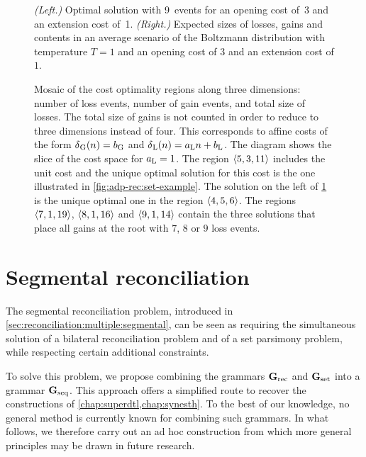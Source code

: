 \begin{figure}[p]
    \capstart
    \centering
    
    \caption[Alternative solution and expected group sizes]{
        \emph{(Left.)}
        Optimal solution with 9~events for an opening cost of~3 and an extension cost of~1.
        \emph{(Right.)}
        Expected sizes of losses, gains and contents in an average scenario of the Boltzmann distribution with temperature \(T=1\) and an opening cost of \(3\) and an extension cost of \(1\).
    }
    \label{fig:adp-rec:set-solutions}
\end{figure}

\begin{figure}[p]
    \capstart
    \centering
    
    \caption[Mosaic of cost regions for a group parsimony instance]{
        Mosaic of the cost optimality regions along three dimensions: number of loss events, number of gain events, and total size of losses.
        The total size of gains is not counted in order to reduce to three dimensions instead of four.
        This corresponds to affine costs of the form \(\delta\kern.1pt_{\mathrm{G}}(n) = b_{\mathrm{G}}\) and \(\delta\kern.1pt_{\mathrm{L}}(n) = a_{\mathrm{L}} n + b_{\mathrm{L}}\).
        The diagram shows the slice of the cost space for \(a_{\mathrm{L}} = 1\).
        The region \(\left\langle5, 3, 11\right\rangle\) includes the unit cost and the unique optimal solution for this cost is the one illustrated in \cref{fig:adp-rec:set-example}.
        The solution on the left of \cref{fig:adp-rec:set-solutions} is the unique optimal one in the region \(\left\langle4, 5, 6\right\rangle\).
        The regions \(\left\langle7, 1, 19\right\rangle\), \(\left\langle8, 1, 16\right\rangle\) and \(\left\langle9, 1, 14\right\rangle\) contain the three solutions that place all gains at the root with \(7\), \(8\) or \(9\) loss events.
    }
    \label{fig:adp-rec:set-pareto}
\end{figure}

\section{Segmental reconciliation}\label{sec:adp-rec:both}

The segmental reconciliation problem, introduced in \cref{sec:reconciliation:multiple:segmental}, can be seen as requiring the simultaneous solution of a bilateral reconciliation problem and of a set parsimony problem, while respecting certain additional constraints.

To solve this problem, we propose combining the grammars \(\mathbf{G}_{\mathrm{rec}}\) and \(\mathbf{G}_{\mathrm{set}}\) into a grammar \(\mathbf{G}_{\mathrm{seq}}\).
This approach offers a simplified route to recover the constructions of \cref{chap:superdtl,chap:synesth}.
To the best of our knowledge, no general method is currently known for combining such grammars.
In what follows, we therefore carry out an ad hoc construction from which more general principles may be drawn in future research.

